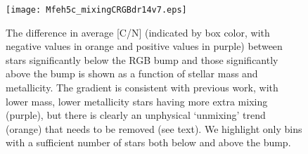 \begin{figure}[!tb]
\begin{center}
\texttt{[image: Mfeh5c\_mixingCRGBdr14v7.eps]}%
\caption{%
The difference in average [C/N] (indicated by box color, with negative values in orange and positive values in purple) between stars significantly below the RGB bump and those significantly above the bump is shown as a function of stellar mass and metallicity. The gradient is consistent with previous work, with lower mass, lower metallicity stars having more extra mixing (purple), but there is clearly an unphysical `unmixing' trend (orange) that needs to be removed (see text). We highlight only bins with a sufficient number of stars both below and above the bump. }
\label{fig:obssquare}
\end{center}
\end{figure}


